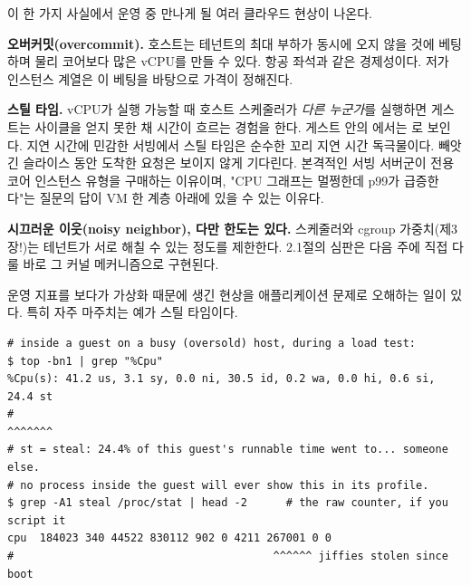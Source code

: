 이 한 가지 사실에서 운영 중 만나게 될 여러 클라우드 현상이 나온다.

\begin{tbbitemize}
  \item \textbf{오버커밋(overcommit).} 호스트는 테넌트의 최대 부하가 동시에 오지 않을 것에 베팅하며 물리 코어보다 많은 vCPU를 만들 수 있다. 항공 좌석과 같은 경제성이다. 저가 인스턴스 계열은 이 베팅을 바탕으로 가격이 정해진다.
  \item \textbf{스틸 타임.} vCPU가 실행 가능할 때 호스트 스케줄러가 \textit{다른 누군가}를 실행하면 게스트는 사이클을 얻지 못한 채 시간이 흐르는 경험을 한다. 게스트 안의 에서는 로 보인다. 지연 시간에 민감한 서빙에서 스틸 타임은 순수한 꼬리 지연 시간 독극물이다. 빼앗긴 슬라이스 동안 도착한 요청은 보이지 않게 기다린다. 본격적인 서빙 서버군이 전용 코어 인스턴스 유형을 구매하는 이유이며, "CPU 그래프는 멀쩡한데 p99가 급증한다"는 질문의 답이 VM 한 계층 아래에 있을 수 있는 이유다.
  \item \textbf{시끄러운 이웃(noisy neighbor), 다만 한도는 있다.} 스케줄러와 cgroup 가중치(제3장!)는 테넌트가 서로 해칠 수 있는 정도를 제한한다. 2.1절의 심판은 다음 주에 직접 다룰 바로 그 커널 메커니즘으로 구현된다.
\end{tbbitemize}

운영 지표를 보다가 가상화 때문에 생긴 현상을 애플리케이션 문제로 오해하는 일이 있다. 특히 자주 마주치는 예가 스틸 타임이다.

\begin{terminalbox}
\begin{Verbatim}[breaklines=true,breakanywhere=true,fontsize=\small,formatcom=\color{tbbtermfg},codes=\tbbcodeactive]
# inside a guest on a busy (oversold) host, during a load test:
$ top -bn1 | grep "%Cpu"
%Cpu(s): 41.2 us, 3.1 sy, 0.0 ni, 30.5 id, 0.2 wa, 0.0 hi, 0.6 si, 24.4 st
#                                                                  ^^^^^^^
# st = steal: 24.4% of this guest's runnable time went to... someone else.
# no process inside the guest will ever show this in its profile.
$ grep -A1 steal /proc/stat | head -2      # the raw counter, if you script it
cpu  184023 340 44522 830112 902 0 4211 267001 0 0
#                                        ^^^^^^ jiffies stolen since boot
\end{Verbatim}
\end{terminalbox}

